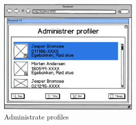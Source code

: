 \begin{figure}
	\centering
		\includegraphics[width=0.60\textwidth]{images/Mocks/13-AdminProfiles.png}
	\caption{Administrate profiles}
	\label{fig:13-AdminProfiles}
\end{figure}







